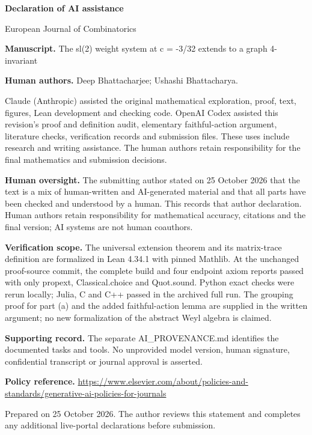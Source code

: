 \documentclass[11pt]{article}
\begin{document}
{\Large\bfseries\color{ink} Declaration of AI assistance}\par
European Journal of Combinatorics\par{}\par\medskip
\textbf{Manuscript.} The sl(2) weight system at c = -3/32 extends to a graph 4-invariant\par

\textbf{Human authors.} Deep Bhattacharjee; Ushashi Bhattacharya.\par

Claude (Anthropic) assisted the original mathematical exploration, proof, text, figures, Lean development and checking code. OpenAI Codex assisted this revision's proof and definition audit, elementary faithful-action argument, literature checks, verification records and submission files. These uses include research and writing assistance. The human authors retain responsibility for the final mathematics and submission decisions.\par

\textbf{Human oversight.} The submitting author stated on 25 October 2026 that the text is a mix of human-written and AI-generated material and that all parts have been checked and understood by a human. This records that author declaration. Human authors retain responsibility for mathematical accuracy, citations and the final version; AI systems are not human coauthors.\par

\textbf{Verification scope.} The universal extension theorem and its matrix-trace definition are formalized in Lean 4.34.1 with pinned Mathlib. At the unchanged proof-source commit, the complete build and four endpoint axiom reports passed with only propext, Classical.choice and Quot.sound. Python exact checks were rerun locally; Julia, C and C++ passed in the archived full run. The grouping proof for part (a) and the added faithful-action lemma are supplied in the written argument; no new formalization of the abstract Weyl algebra is claimed.\par

\textbf{Supporting record.} The separate AI\_PROVENANCE.md identifies the documented tasks and tools. No unprovided model version, human signature, confidential transcript or journal approval is asserted.\par

\textbf{Policy reference.} \url{https://www.elsevier.com/about/policies-and-standards/generative-ai-policies-for-journals}\par

{\small Prepared on 25 October 2026. The author reviews this statement and completes any additional live-portal declarations before submission.}
\end{document}
